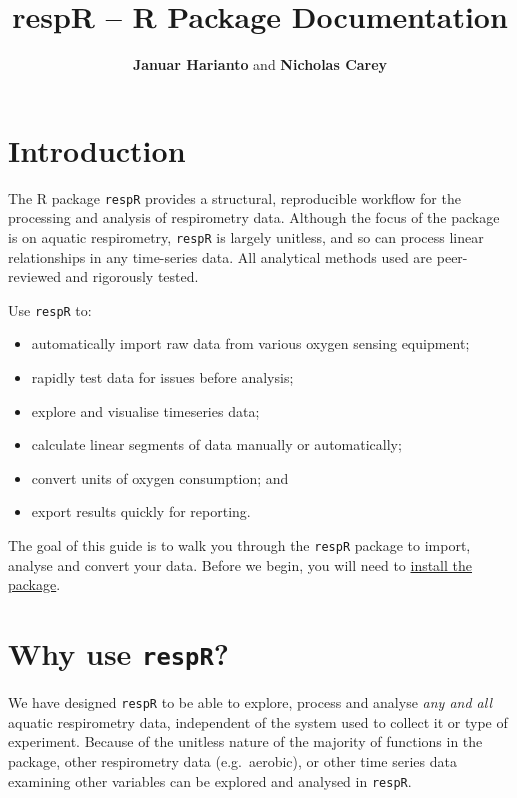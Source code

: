 \documentclass[]{book}
\title{respR -- R Package Documentation}
\author{\textbf{Januar Harianto} and \textbf{Nicholas Carey}}
\date{}
\providecommand{\tightlist}{%
  \setlength{\itemsep}{0pt}\setlength{\parskip}{0pt}}
\begin{document}
\maketitle

{
\setcounter{tocdepth}{1}
\tableofcontents
}
\chapter{Introduction}\label{introduction}

The R package \texttt{respR} provides a structural, reproducible
workflow for the processing and analysis of respirometry data. Although
the focus of the package is on aquatic respirometry, \texttt{respR} is
largely unitless, and so can process linear relationships in any
time-series data. All analytical methods used are peer-reviewed and
rigorously tested.

Use \texttt{respR} to:

\begin{itemize}
\tightlist
\item
  automatically import raw data from various oxygen sensing equipment;
\item
  rapidly test data for issues before analysis;
\item
  explore and visualise timeseries data;
\item
  calculate linear segments of data manually or automatically;
\item
  convert units of oxygen consumption; and
\item
  export results quickly for reporting.
\end{itemize}

The goal of this guide is to walk you through the \texttt{respR} package
to import, analyse and convert your data. Before we begin, you will need
to \protect\hyperlink{installation}{install the package}.

\chapter{\texorpdfstring{Why use
\texttt{respR}?}{Why use respR?}}\label{why-use-respr}

We have designed \texttt{respR} to be able to explore, process and
analyse \emph{any and all} aquatic respirometry data, independent of the
system used to collect it or type of experiment. Because of the unitless
nature of the majority of functions in the package, other respirometry
data (e.g.~aerobic), or other time series data examining other variables
can be explored and analysed in \texttt{respR}.
\end{document}
